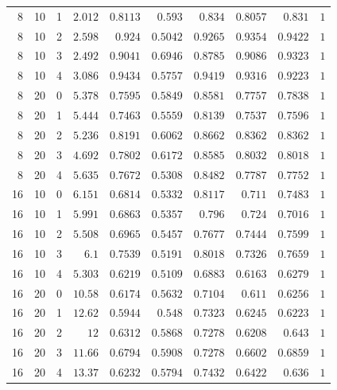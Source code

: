 \begin{table}[ht]
\begin{tabular}{@{}rrrrrrrrrr@{}}
8 & 10 & 1 & $2.012$ & $0.8113$ & $0.593$ & $0.834$ & $0.8057$ & $0.831$ & $1$\\
8 & 10 & 2 & $2.598$ & $0.924$ & $0.5042$ & $0.9265$ & $0.9354$ & $0.9422$ & $1$\\
8 & 10 & 3 & $2.492$ & $0.9041$ & $0.6946$ & $0.8785$ & $0.9086$ & $0.9323$ & $1$\\
8 & 10 & 4 & $3.086$ & $0.9434$ & $0.5757$ & $0.9419$ & $0.9316$ & $0.9223$ & $1$\\
8 & 20 & 0 & $5.378$ & $0.7595$ & $0.5849$ & $0.8581$ & $0.7757$ & $0.7838$ & $1$\\
8 & 20 & 1 & $5.444$ & $0.7463$ & $0.5559$ & $0.8139$ & $0.7537$ & $0.7596$ & $1$\\
8 & 20 & 2 & $5.236$ & $0.8191$ & $0.6062$ & $0.8662$ & $0.8362$ & $0.8362$ & $1$\\
8 & 20 & 3 & $4.692$ & $0.7802$ & $0.6172$ & $0.8585$ & $0.8032$ & $0.8018$ & $1$\\
8 & 20 & 4 & $5.635$ & $0.7672$ & $0.5308$ & $0.8482$ & $0.7787$ & $0.7752$ & $1$\\
\midrule
16 & 10 & 0 & $6.151$ & $0.6814$ & $0.5332$ & $0.8117$ & $0.711$ & $0.7483$ & $1$\\
16 & 10 & 1 & $5.991$ & $0.6863$ & $0.5357$ & $0.796$ & $0.724$ & $0.7016$ & $1$\\
16 & 10 & 2 & $5.508$ & $0.6965$ & $0.5457$ & $0.7677$ & $0.7444$ & $0.7599$ & $1$\\
16 & 10 & 3 & $6.1$ & $0.7539$ & $0.5191$ & $0.8018$ & $0.7326$ & $0.7659$ & $1$\\
16 & 10 & 4 & $5.303$ & $0.6219$ & $0.5109$ & $0.6883$ & $0.6163$ & $0.6279$ & $1$\\
16 & 20 & 0 & $10.58$ & $0.6174$ & $0.5632$ & $0.7104$ & $0.611$ & $0.6256$ & $1$\\
16 & 20 & 1 & $12.62$ & $0.5944$ & $0.548$ & $0.7323$ & $0.6245$ & $0.6223$ & $1$\\
16 & 20 & 2 & $12$ & $0.6312$ & $0.5868$ & $0.7278$ & $0.6208$ & $0.643$ & $1$\\
16 & 20 & 3 & $11.66$ & $0.6794$ & $0.5908$ & $0.7278$ & $0.6602$ & $0.6859$ & $1$\\
16 & 20 & 4 & $13.37$ & $0.6232$ & $0.5794$ & $0.7432$ & $0.6422$ & $0.636$ & $1$\\
\bottomrule
\end{tabular}
\end{table}

